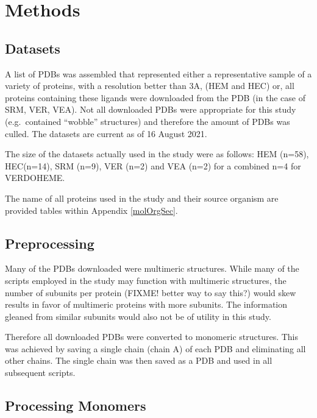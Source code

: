 \documentclass[a4paper, nobind]{templates/ociamthesis}
\begin{document}
\adjustmtc
{}

\hypertarget{methods}{%
\chapter{Methods}\label{methods}}

\minitoc

\hypertarget{datasets}{%
\section{Datasets}\label{datasets}}

\noindent A list of PDBs was assembled that represented either a representative sample of a variety of proteins, with a resolution better than 3A, (HEM and HEC) or, all proteins containing these ligands were downloaded from the PDB (in the case of SRM, VER, VEA). Not all downloaded PDBs were appropriate for this study (e.g.~contained ``wobble'' structures) and therefore the amount of PDBs was culled. The datasets are current as of 16 August 2021.

The size of the datasets actually used in the study were as follows: HEM (n=58), HEC(n=14), SRM (n=9), VER (n=2) and VEA (n=2) for a combined n=4 for VERDOHEME.

The name of all proteins used in the study and their source organism are provided tables within Appendix \ref{molOrgSec}.

\hypertarget{preprocessing}{%
\section{Preprocessing}\label{preprocessing}}

Many of the PDBs downloaded were multimeric structures. While many of the scripts employed in the study may function with multimeric structures, the number of subunits per protein (FIXME! better way to say this?) would skew results in favor of multimeric proteins with more subunits. The information gleaned from similar subunits would also not be of utility in this study.

Therefore all downloaded PDBs were converted to monomeric structures. This was achieved by saving a single chain (chain A) of each PDB and eliminating all other chains. The single chain was then saved as a PDB and used in all subsequent scripts.

\hypertarget{processing-monomers}{%
\section{Processing Monomers}\label{processing-monomers}}
\end{document}
